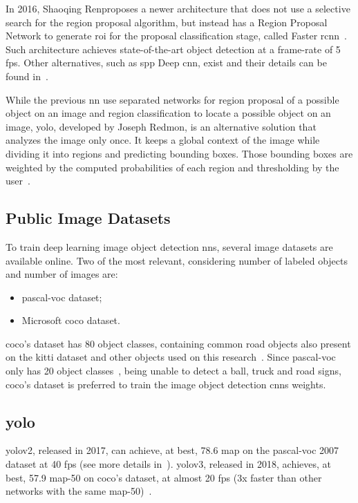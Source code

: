 In 2016, Shaoqing Ren\etal proposes a newer architecture that does not use a selective search for the region proposal algorithm, but instead has a Region Proposal Network to generate \ac{roi} for the proposal classification stage, called Faster \ac{rcnn}~\cite{Ren2017}. Such architecture achieves state-of-the-art object detection at a frame-rate of 5 \ac{fps}. Other alternatives, such as \ac{spp} Deep \ac{cnn}, exist and their details can be found in~\cite{He2015}.

While the previous \ac{nn} use separated networks for region proposal of a possible object on an image and region classification to locate a possible object on an image, \acf{yolo}, developed by Joseph Redmon, is an alternative solution that analyzes the image only once. It keeps a global context of the image while dividing it into regions and predicting bounding boxes. Those bounding boxes are weighted by the computed probabilities of each region and thresholding by the user~\cite{Redmon2016}. 

\subsection{Public Image Datasets}
To train deep learning image object detection \acp{nn}, several image datasets are available online. Two of the most relevant, considering number of labeled objects and number of images are:

\begin{itemize}
	\item \ac{pascal-voc} dataset;
	\item Microsoft \acf{coco} dataset.
\end{itemize}

\ac{coco}'s dataset has 80 object classes, containing common road objects also present on the \ac{kitti} dataset and other objects used on this research~\cite{Lin2014a}. Since \ac{pascal-voc} only has 20 object classes~\cite{Everingham2010}, being unable to detect a ball, truck and road signs, \ac{coco}'s dataset is preferred to train the image object detection \acp{cnn} weights.

\subsection{\ac{yolo}}
\ac{yolo}v2, released in 2017, can achieve, at best, 78.6 \ac{map} on the \ac{pascal-voc} 2007 dataset at 40 \ac{fps} (see more details in~\cite{Redmon2017}). \ac{yolo}v3, released in 2018, achieves, at best, 57.9 \ac{map}-50 on \ac{coco}'s dataset, at almost 20 \ac{fps} (3x faster than other networks with the same \ac{map}-50)~\cite{Redmon2018}.

